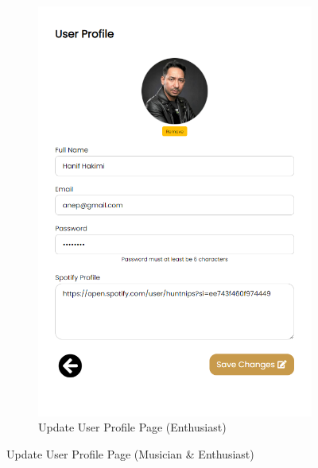 \begin{enumerate}[1.]
\begin{figure}[h]
\begin{subfigure}[b]{0.4\textwidth}
            \includegraphics[width=\textwidth]{mainmatter/images/frontend/ss/User Profile4 (Musician-Enthusiast).png}
            \caption{Update User Profile Page (Enthusiast)}
            \label{fig:sub2}
        \end{subfigure}
        \caption{Update User Profile Page (Musician \& Enthusiast)}
        \label{fig:myfig54}
    \end{figure}
    \begin{figure}[h]\ContinuedFloat
        \centering
        \begin{subfigure}[b]{0.7\textwidth}
            \centering

\end{subfigure}
\end{figure}
\end{enumerate}
